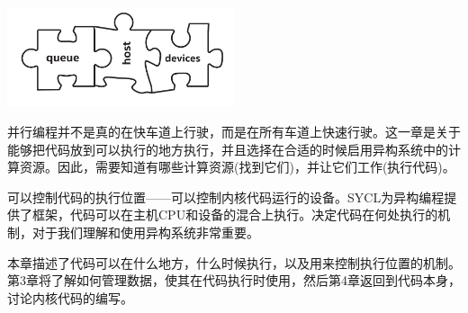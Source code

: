 \begin{center}
	\includegraphics[width=0.5\textwidth]{content/chapter-2/images/1}
\end{center}

并行编程并不是真的在快车道上行驶，而是在所有车道上快速行驶。这一章是关于能够把代码放到可以执行的地方执行，并且选择在合适的时候启用异构系统中的计算资源。因此，需要知道有哪些计算资源(找到它们)，并让它们工作(执行代码)。\par

可以控制代码的执行位置——可以控制内核代码运行的设备。SYCL为异构编程提供了框架，代码可以在主机CPU和设备的混合上执行。决定代码在何处执行的机制，对于我们理解和使用异构系统非常重要。\par

本章描述了代码可以在什么地方，什么时候执行，以及用来控制执行位置的机制。第3章将了解如何管理数据，使其在代码执行时使用，然后第4章返回到代码本身，讨论内核代码的编写。\par